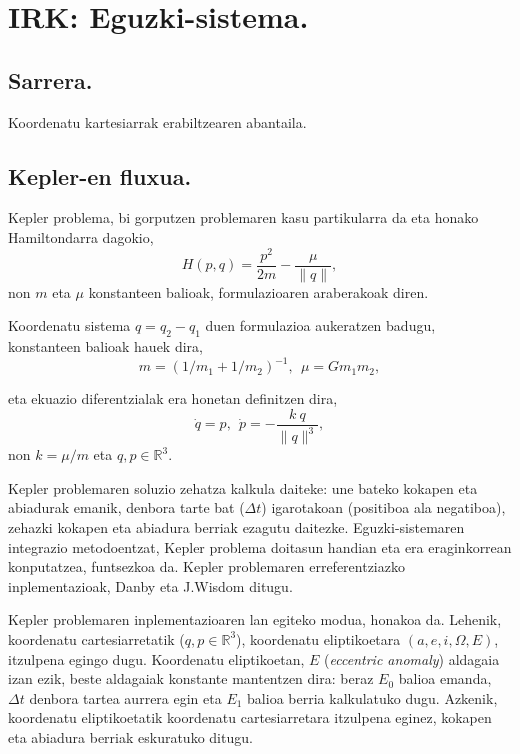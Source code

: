\chapter{IRK: Eguzki-sistema.}

\section{Sarrera.}

Koordenatu kartesiarrak erabiltzearen abantaila.

\section{Kepler-en fluxua.}
   
Kepler problema, bi gorputzen problemaren kasu partikularra da eta  honako Hamiltondarra dagokio,
\begin{equation}
H(p,q)=\frac{p^2}{2m}-\frac{\mu}{\|q\|},
\end{equation}
non $m$ eta $\mu$ konstanteen balioak, formulazioaren araberakoak diren.

Koordenatu sistema $q=q_2-q_1$ duen formulazioa aukeratzen badugu, konstanteen balioak hauek dira,  
\begin{equation*}
m=(1/m_1+1/m_2)^{-1},\ \ \mu=Gm_1m_2,
\end{equation*} 

eta ekuazio diferentzialak era honetan definitzen dira,
\begin{equation}
\dot{q}=p, \ \ \dot{p}= - \frac{k \ q}{\|q\|^3} ,
\end{equation}
non $k= \mu / m$ eta  $q,p \in \mathbb{R}^3$.

Kepler problemaren soluzio zehatza kalkula daiteke: une bateko kokapen eta abiadurak emanik, denbora tarte bat ($\Delta t$) igarotakoan (positiboa ala negatiboa), zehazki kokapen eta abiadura berriak ezagutu daitezke. Eguzki-sistemaren integrazio metodoentzat, Kepler problema doitasun handian eta era eraginkorrean konputatzea, funtsezkoa da. Kepler problemaren erreferentziazko inplementazioak, Danby \cite{Danby1992} eta J.Wisdom  \cite{Wisdom2015} ditugu. 

Kepler problemaren inplementazioaren lan egiteko modua, honakoa da. Lehenik, koordenatu cartesiarretatik ($q,p\in \mathbb{R}^3$), koordenatu eliptikoetara $(a,e,i,\Omega,E)$, itzulpena egingo dugu. Koordenatu eliptikoetan, $E$ (\emph{eccentric anomaly}) aldagaia izan ezik, beste aldagaiak konstante mantentzen dira: beraz $E_0$ balioa emanda, $\Delta t$ denbora tartea aurrera egin eta $E_1$ balioa berria kalkulatuko dugu. Azkenik, koordenatu eliptikoetatik koordenatu cartesiarretara itzulpena eginez, kokapen eta abiadura berriak eskuratuko ditugu. 

